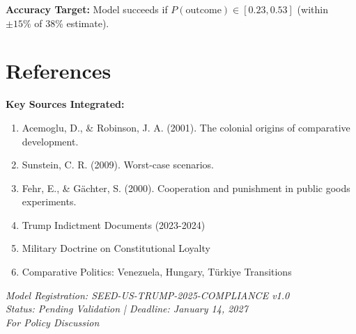\textbf{Accuracy Target:} Model succeeds if $P(\text{outcome}) \in [0.23, 0.53]$ (within $\pm 15\%$ of 38\% estimate).


\section{References}

\nocite{bcm_master}

\textbf{Key Sources Integrated:}
\begin{enumerate}
\item Acemoglu, D., \& Robinson, J. A. (2001). The colonial origins of comparative development.
\item Sunstein, C. R. (2009). Worst-case scenarios.
\item Fehr, E., \& Gächter, S. (2000). Cooperation and punishment in public goods experiments.
\item Trump Indictment Documents (2023-2024)
\item Military Doctrine on Constitutional Loyalty
\item Comparative Politics: Venezuela, Hungary, Türkiye Transitions
\end{enumerate}

\vspace{2cm}

\begin{center}
\textit{Model Registration: SEED-US-TRUMP-2025-COMPLIANCE v1.0} \\
\textit{Status: Pending Validation | Deadline: January 14, 2027} \\
\textit{For Policy Discussion}
\end{center}


